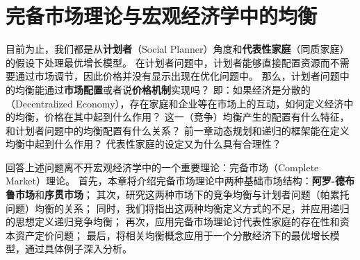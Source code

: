 

\chapter{完备市场理论与宏观经济学中的均衡}  \label{ch-equilibrium}

目前为止，我们都是从\textbf{计划者}（Social Planner）角度和\textbf{代表性家庭}（同质家庭）的假设下处理最优增长模型。
在计划者问题中，计划者能够直接配置资源而不需要通过市场调节，因此价格并没有显示出现在优化问题中。
那么，计划者问题中的均衡能通过\textbf{市场配置}或者说\textbf{价格机制}实现吗？
即：如果经济是分散的（Decentralized Economy），存在家庭和企业等在市场上的互动，如何定义经济中的均衡，价格在其中起到什么作用？
这一（竞争）均衡产生的配置有什么特征，和计划者问题中的均衡配置有什么关系？
前一章动态规划和递归的框架能在定义均衡中起到什么作用？
代表性家庭的设定又为什么具有合理性？

回答上述问题离不开宏观经济学中的一个重要理论：完备市场（Complete Market）理论。
首先，本章将介绍完备市场理论中两种基础市场结构：\textbf{阿罗-德布鲁市场}和\textbf{序贯市场}；
其次，研究这两种市场下的竞争均衡与计划者问题（帕累托问题）均衡的关系；
同时，我们将指出这两种均衡定义方式的不足，并应用递归的思想定义递归竞争均衡；
再次，应用完备市场理论讨代表性家庭的存在性和资本资产定价问题；
最后，将相关均衡概念应用于一个分散经济下的最优增长模型，通过具体例子深入分析。
















